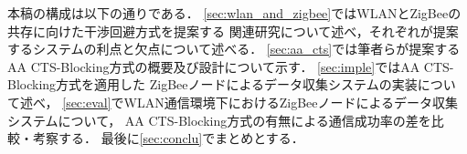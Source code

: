 \documentclass[technicalreport]{ieicej}
\begin{document}
本稿の構成は以下の通りである．
\ref{sec:wlan_and_zigbee}ではWLANとZigBeeの共存に向けた干渉回避方式を提案する
関連研究について述べ，それぞれが提案するシステムの利点と欠点について述べる．
\ref{sec:aa_cts}では筆者らが提案するAA CTS-Blocking方式の概要及び設計について示す．
\ref{sec:imple}ではAA CTS-Blocking方式を適用した
ZigBeeノードによるデータ収集システムの実装について述べ，
\ref{sec:eval}でWLAN通信環境下におけるZigBeeノードによるデータ収集システムについて，
AA CTS-Blocking方式の有無による通信成功率の差を比較・考察する．
最後に\ref{sec:conclu}でまとめとする．




\end{document}
